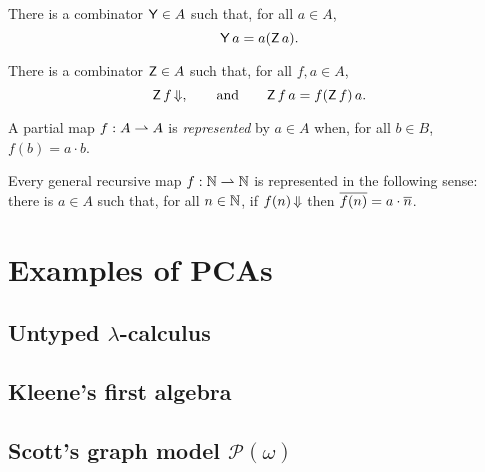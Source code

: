 \begin{definition}
  \label{def:combinator-Y}
  \leanok
  There is a combinator $\mathsf{Y} \in A$ such that, for all $a \in A$,
  \begin{equation*}
    \mathsf{Y} \, a = a (\mathsf{Z} \, a).
  \end{equation*}
\end{definition}

\begin{definition}
  \label{def:combinator-Z}
  \leanok
  There is a combinator $\mathsf{Z} \in A$ such that, for all $f, a \in A$,
  \begin{equation*}
    \mathsf{Z} \, f\,{\Downarrow},
    \qquad\text{and}\qquad
    \mathsf{Z} \, f \, a = f (\mathsf{Z} \, f) \, a.
  \end{equation*}
\end{definition}

\begin{definition}
  \label{def:representable-function}
  A partial map $f : A \rightharpoonup A$ is \emph{represented} by $a \in A$ when,
  for all $b \in B$, $f(b) = a \cdot b$.
\end{definition}

\begin{theorem}
  \label{thm:recursive-map-representable}
  Every general recursive map $f : \mathbb{N} \rightharpoonup \mathbb{N}$ is represented in the following sense:
  there is $a \in A$ such that, for all $n \in \mathbb{N}$, if $f(n)\,{\Downarrow}$ then $\overline{f(n)} = a \cdot \overline{n}$.
\end{theorem}

\section{Examples of PCAs}

\subsection{Untyped $\lambda$-calculus}
\label{sec:untyped-lambda-calculus}

\subsection{Kleene's first algebra}
\label{sec:kleenes-first-algebra}

\subsection{Scott's graph model $\mathcal{P}(\omega)$}
\label{sec:scotts-graph-model}




